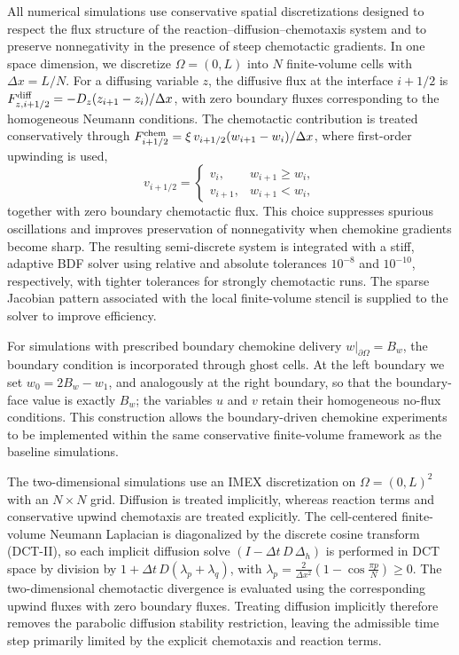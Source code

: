 \documentclass[]{interact}
\theoremstyle{plain}%
\theoremstyle{definition}
\theoremstyle{remark}
\newcommand{\Om}{\Omega}
\begin{document}
All numerical simulations use conservative spatial discretizations designed to
respect the flux structure of the reaction--diffusion--chemotaxis system and to
preserve nonnegativity in the presence of steep chemotactic gradients. In one
space dimension, we discretize $\Om=(0,L)$ into $N$ finite-volume cells with
$\Delta x=L/N$. For a diffusing variable $z$, the diffusive flux at the
interface $i+1/2$ is
$F^{\rm diff}_{z,i+1/2}
=-D_z(z_{i+1}-z_i)/\Delta x$,
with zero boundary fluxes corresponding to the homogeneous Neumann conditions.
The chemotactic contribution is treated conservatively through
$F^{\rm chem}_{i+1/2}
=\xi\,v_{i+1/2}(w_{i+1}-w_i)/\Delta x$,
where first-order upwinding is used,
\[
v_{i+1/2}=
\begin{cases}
v_i, & w_{i+1}\ge w_i,\\
v_{i+1}, & w_{i+1}<w_i,
\end{cases}
\]
together with zero boundary chemotactic flux. This choice suppresses spurious
oscillations and improves preservation of nonnegativity when chemokine
gradients become sharp. The resulting semi-discrete system is integrated with a
stiff, adaptive BDF solver using relative and absolute tolerances
$10^{-8}$ and $10^{-10}$, respectively, with tighter tolerances for strongly
chemotactic runs. The sparse Jacobian pattern associated with the local
finite-volume stencil is supplied to the solver to improve efficiency.

For simulations with prescribed boundary chemokine delivery
$w|_{\partial\Om}=B_w$, the boundary condition is incorporated through ghost
cells. At the left boundary we set
$w_0=2B_w-w_1$, and analogously at the right boundary, so that the boundary-face
value is exactly $B_w$; the variables $u$ and $v$ retain their homogeneous
no-flux conditions. This construction allows the boundary-driven chemokine
experiments to be implemented within the same conservative finite-volume
framework as the baseline simulations.

The two-dimensional simulations use an IMEX discretization on
$\Om=(0,L)^2$ with an $N\times N$ grid. Diffusion is treated implicitly,
whereas reaction terms and conservative upwind chemotaxis are treated
explicitly. The cell-centered finite-volume Neumann Laplacian is diagonalized
by the discrete cosine transform (DCT-II), so each implicit diffusion solve
$(I-\Delta t\,D\,\Delta_h)$
is performed in DCT space by division by
$1+\Delta t\,D(\lambda_p+\lambda_q)$, with
$\lambda_p=\frac{2}{\Delta x^2}
\left(1-\cos\frac{\pi p}{N}\right)\ge0$.
The two-dimensional chemotactic divergence is evaluated using the corresponding
upwind fluxes with zero boundary fluxes. Treating diffusion implicitly therefore
removes the parabolic diffusion stability restriction, leaving the admissible
time step primarily limited by the explicit chemotaxis and reaction terms.
\end{document}
